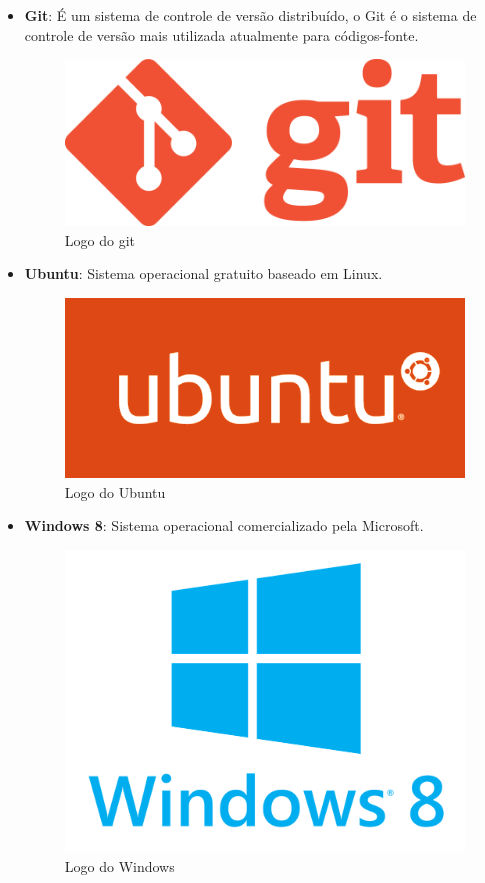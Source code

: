 \documentclass[11pt]{article} %
\begin{document}
\begin{itemize}
\item \textbf{Git}: É um sistema de controle de versão distribuído, o Git é o sistema de controle de versão mais utilizada atualmente para códigos-fonte.
\begin{figure}[!htp]
\centering
\includegraphics[scale=0.1]{res/git.png}
\caption{Logo do git}
\label{Logo do git}
\end{figure}

\item \textbf{Ubuntu}: Sistema operacional gratuito baseado em Linux.

\begin{figure}[!htp]
\centering
\includegraphics[scale=0.2]{res/ubuntu.png}
\caption{Logo do Ubuntu}
\label{Logo do Ubuntu}
\end{figure}

\item \textbf{Windows 8}: Sistema operacional comercializado pela Microsoft.

\begin{figure}[!htp]
\centering
\includegraphics[scale=0.05]{res/windows.png}
\caption{Logo do Windows}
\label{Logo do Windows}
\end{figure}

\end{itemize}
\end{document}
